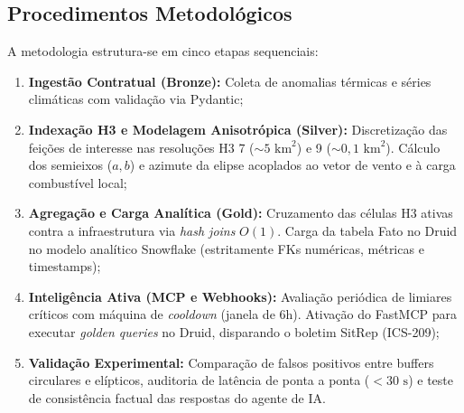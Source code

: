 \subsection{Procedimentos Metodológicos}
A metodologia estrutura-se em cinco etapas sequenciais:
\begin{enumerate}
    \setlength\itemsep{0em}
    \item \textbf{Ingestão Contratual (Bronze):} Coleta de anomalias térmicas e séries climáticas com validação via Pydantic;
    \item \textbf{Indexação H3 e Modelagem Anisotrópica (Silver):} Discretização das feições de interesse nas resoluções H3 7 ($\sim 5\text{ km}^2$) e 9 ($\sim 0,1\text{ km}^2$). Cálculo dos semieixos ($a, b$) e azimute da elipse acoplados ao vetor de vento e à carga combustível local;
    \item \textbf{Agregação e Carga Analítica (Gold):} Cruzamento das células H3 ativas contra a infraestrutura via \textit{hash joins} $O(1)$. Carga da tabela Fato no Druid no modelo analítico Snowflake (estritamente FKs numéricas, métricas e timestamps);
    \item \textbf{Inteligência Ativa (MCP e Webhooks):} Avaliação periódica de limiares críticos com máquina de \textit{cooldown} (janela de 6h). Ativação do FastMCP para executar \textit{golden queries} no Druid, disparando o boletim SitRep (ICS-209);
    \item \textbf{Validação Experimental:} Comparação de falsos positivos entre buffers circulares e elípticos, auditoria de latência de ponta a ponta ($< 30\text{ s}$) e teste de consistência factual das respostas do agente de IA.
\end{enumerate}
